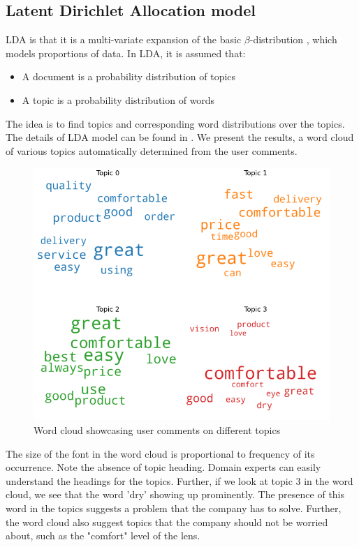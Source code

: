 \documentclass[11pt, letterpaper]{article}
\begin{document}
\subsection{Latent Dirichlet Allocation model}
LDA is that it is a multi-variate expansion of the basic $\beta$-distribution \autocite{betadistribution}, which models proportions of data. In LDA, it is assumed that:
\begin{itemize}
    \item A document is a probability distribution of topics
    \item A topic is a probability distribution of words
\end{itemize}
The idea is to find topics and corresponding word distributions over the topics. The details of LDA model can be found in \autocite{topicmodelinglda}. We present the results, a word cloud of various topics automatically determined from the user comments.
\begin{figure}[H]%
    \centering
    \includegraphics[width=\linewidth]{word_cloud.png}%
    \caption{Word cloud showcasing user comments on different topics}%
    \label{fig:word_cloud}
\end{figure}
The size of the font in the word cloud is proportional to frequency of its occurrence. Note the absence of topic heading. Domain experts can easily understand the headings for the topics. Further, if we look at topic 3 in the word cloud, we see that the word 'dry' showing up prominently. The presence of this word in the topics suggests a problem that the company has to solve. Further, the word cloud also suggest topics that the company should not be worried about, such as the "comfort" level of the lens.
\end{document}
